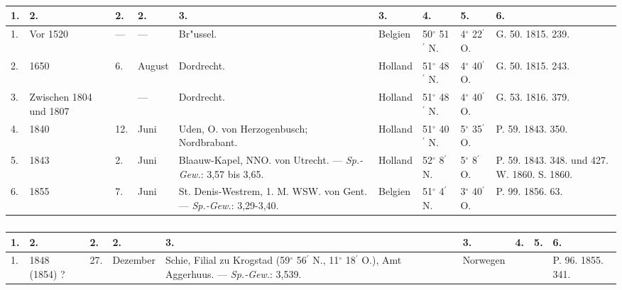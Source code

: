 \documentclass[a4paper, 8pt, oneside, polutonikogreek, german]{article}
\begin{document}
\subsubsection{}
\begin{table}[H]
    \centering
    \swabfamily
    \footnotesize
    \begin{longtable}{|p{3mm}|p{10mm}|p{5mm}|p{9mm}|p{25mm}|p{13mm}|p{11mm}|p{11mm}|p{18mm}|}
    \hline
        1. & 2. & 2. & 2. & 3. & 3. & 4. & 5. & 6. \\ \hline
        1. & Vor 1520 & --- & --- & Br"ussel. & Belgien & 50$^\circ$ 51$^\prime$ N. & 4$^\circ$ 22$^\prime$ O. & G. 50. 1815. 239. \\ \hline
        2. & 1650 & 6. & August & Dordrecht. & Holland & 51$^\circ$ 48$^\prime$ N. & 4$^\circ$ 40$^\prime$ O. & G. 50. 1815. 243. \\ \hline
        3. & Zwischen 1804 und 1807 & ~ & --- & Dordrecht. & Holland & 51$^\circ$ 48$^\prime$ N. & 4$^\circ$ 40$^\prime$ O. & G. 53. 1816. 379. \\ \hline
        4. & 1840 & 12. & Juni & Uden, O. von Herzogenbusch; Nordbrabant. & Holland & 51$^\circ$ 40$^\prime$ N. & 5$^\circ$ 35$^\prime$ O. & P. 59. 1843. 350. \\ \hline
        5. & 1843 & 2. & Juni & Blaauw-Kapel, NNO. von Utrecht. --- \emph{Sp.-Gew.}: 3,57 bis 3,65. & Holland & 52$^\circ$ 8$^\prime$ N. & 5$^\circ$ 8$^\prime$ O. & P. 59. 1843. 348. und 427. W. 1860. S. 1860. \\ \hline
        6. & 1855 & 7. & Juni & St. Denis-Westrem, 1. M. WSW. von Gent. --- \emph{Sp.-Gew.}: 3,29-3,40. & Belgien & 51$^\circ$ 4$^\prime$ N. & 3$^\circ$ 40$^\prime$ O. & P. 99. 1856. 63. \\ \hline
    \end{longtable}
\end{table}
\subsubsection{}
\begin{table}[H]
    \centering
    \swabfamily
    \footnotesize
    \begin{longtable}{|l|p{17mm}|l|l|p{30mm}|l|l|l|p{13mm}|}
    \hline
        1. & 2. & 2. & 2. & 3. & 3. & 4. & 5. & 6. \\ \hline
        1. & 1848 (1854) ? & 27. & Dezember & Schie, Filial zu Krogstad (59$^\circ$ 56$^\prime$ N., 11$^\circ$ 18$^\prime$ O.), Amt Aggerhuus. --- \emph{Sp.-Gew.}: 3,539. & Norwegen & ~ & ~ & P. 96. 1855. 341. \\ \hline
    \end{longtable}
\end{table}
\end{document}

